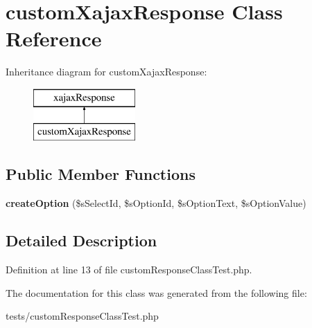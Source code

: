 \hypertarget{classcustomXajaxResponse}{
\section{customXajaxResponse Class Reference}
\label{classcustomXajaxResponse}
}
Inheritance diagram for customXajaxResponse:\begin{figure}[H]
\begin{center}
\leavevmode
\includegraphics[height=2.000000cm]{classcustomXajaxResponse}
\end{center}
\end{figure}
\subsection*{Public Member Functions}
\begin{DoxyCompactItemize}
\item 
\hypertarget{classcustomXajaxResponse_a3671e0005de23d5ed56fbac44c4a82c4}{
{\bfseries createOption} (\$sSelectId, \$sOptionId, \$sOptionText, \$sOptionValue)}
\label{classcustomXajaxResponse_a3671e0005de23d5ed56fbac44c4a82c4}

\end{DoxyCompactItemize}


\subsection{Detailed Description}


Definition at line 13 of file customResponseClassTest.php.



The documentation for this class was generated from the following file:\begin{DoxyCompactItemize}
\item 
tests/customResponseClassTest.php\end{DoxyCompactItemize}
